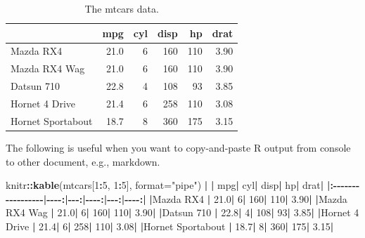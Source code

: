 \documentclass[
  a4paper,
  twoside,
  openright]{book}
\newenvironment{Shaded}{\begin{snugshade}}{\end{snugshade}}
\newcommand{\AttributeTok}[1]{\textcolor[rgb]{0.13,0.29,0.53}{#1}}
\newcommand{\DecValTok}[1]{\textcolor[rgb]{0.00,0.00,0.81}{#1}}
\newcommand{\ErrorTok}[1]{\textcolor[rgb]{0.64,0.00,0.00}{\textbf{#1}}}
\newcommand{\FloatTok}[1]{\textcolor[rgb]{0.00,0.00,0.81}{#1}}
\newcommand{\FunctionTok}[1]{\textcolor[rgb]{0.13,0.29,0.53}{\textbf{#1}}}
\newcommand{\NormalTok}[1]{#1}
\newcommand{\SpecialCharTok}[1]{\textcolor[rgb]{0.81,0.36,0.00}{\textbf{#1}}}
\newcommand{\StringTok}[1]{\textcolor[rgb]{0.31,0.60,0.02}{#1}}
\theoremstyle{definition}
\theoremstyle{definition}
\theoremstyle{definition}
\theoremstyle{definition}
\theoremstyle{remark}
\begin{document}
\begin{table}

\caption{\label{tab:mtcars}The mtcars data.}
\centering
\begin{tabular}[t]{l|r|r|r|r|r}
\hline
  & mpg & cyl & disp & hp & drat\\
\hline
Mazda RX4 & 21.0 & 6 & 160 & 110 & 3.90\\
\hline
Mazda RX4 Wag & 21.0 & 6 & 160 & 110 & 3.90\\
\hline
Datsun 710 & 22.8 & 4 & 108 & 93 & 3.85\\
\hline
Hornet 4 Drive & 21.4 & 6 & 258 & 110 & 3.08\\
\hline
Hornet Sportabout & 18.7 & 8 & 360 & 175 & 3.15\\
\hline
\end{tabular}
\end{table}

The following is useful when you want to copy-and-paste R output from console to other document, e.g., markdown.

\begin{Shaded}
\begin{Highlighting}[]
\NormalTok{knitr}\SpecialCharTok{::}\FunctionTok{kable}\NormalTok{(mtcars[}\DecValTok{1}\SpecialCharTok{:}\DecValTok{5}\NormalTok{, }\DecValTok{1}\SpecialCharTok{:}\DecValTok{5}\NormalTok{], }\AttributeTok{format=}\StringTok{"pipe"}\NormalTok{)}
\SpecialCharTok{|}                  \ErrorTok{|}\NormalTok{  mpg}\SpecialCharTok{|}\NormalTok{ cyl}\SpecialCharTok{|}\NormalTok{ disp}\SpecialCharTok{|}\NormalTok{  hp}\SpecialCharTok{|}\NormalTok{ drat}\SpecialCharTok{|}
\ErrorTok{|:}\SpecialCharTok{{-}{-}{-}{-}{-}{-}{-}{-}{-}{-}{-}{-}{-}{-}{-}{-}{-}}\ErrorTok{|}\SpecialCharTok{{-}{-}{-}{-}}\ErrorTok{:|}\SpecialCharTok{{-}{-}{-}}\ErrorTok{:|}\SpecialCharTok{{-}{-}{-}{-}}\ErrorTok{:|}\SpecialCharTok{{-}{-}{-}}\ErrorTok{:|}\SpecialCharTok{{-}{-}{-}{-}}\ErrorTok{:|}
\ErrorTok{|}\NormalTok{Mazda RX4         }\SpecialCharTok{|} \FloatTok{21.0}\SpecialCharTok{|}   \DecValTok{6}\SpecialCharTok{|}  \DecValTok{160}\SpecialCharTok{|} \DecValTok{110}\SpecialCharTok{|} \FloatTok{3.90}\SpecialCharTok{|}
\ErrorTok{|}\NormalTok{Mazda RX4 Wag     }\SpecialCharTok{|} \FloatTok{21.0}\SpecialCharTok{|}   \DecValTok{6}\SpecialCharTok{|}  \DecValTok{160}\SpecialCharTok{|} \DecValTok{110}\SpecialCharTok{|} \FloatTok{3.90}\SpecialCharTok{|}
\ErrorTok{|}\NormalTok{Datsun }\DecValTok{710}        \SpecialCharTok{|} \FloatTok{22.8}\SpecialCharTok{|}   \DecValTok{4}\SpecialCharTok{|}  \DecValTok{108}\SpecialCharTok{|}  \DecValTok{93}\SpecialCharTok{|} \FloatTok{3.85}\SpecialCharTok{|}
\ErrorTok{|}\NormalTok{Hornet }\DecValTok{4}\NormalTok{ Drive    }\SpecialCharTok{|} \FloatTok{21.4}\SpecialCharTok{|}   \DecValTok{6}\SpecialCharTok{|}  \DecValTok{258}\SpecialCharTok{|} \DecValTok{110}\SpecialCharTok{|} \FloatTok{3.08}\SpecialCharTok{|}
\ErrorTok{|}\NormalTok{Hornet Sportabout }\SpecialCharTok{|} \FloatTok{18.7}\SpecialCharTok{|}   \DecValTok{8}\SpecialCharTok{|}  \DecValTok{360}\SpecialCharTok{|} \DecValTok{175}\SpecialCharTok{|} \FloatTok{3.15}\SpecialCharTok{|}
\end{Highlighting}
\end{Shaded}
\end{document}
